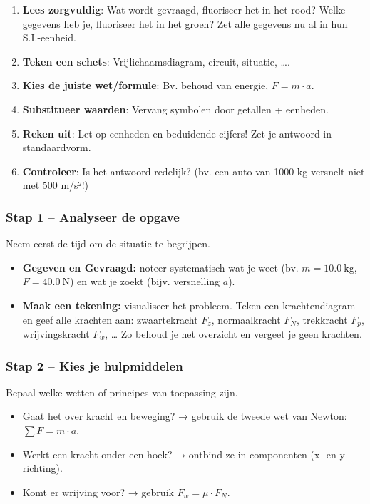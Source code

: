 {\begin{tcolorbox}[colback=cyan!5!white,colframe=cyan!75!black,title=Stappenplan voor fysica-problemen]
\begin{enumerate}
    \item \textbf{Lees zorgvuldig}: Wat wordt gevraagd, fluoriseer het in het rood? Welke gegevens heb je, fluoriseer het in het groen? Zet alle gegevens nu al in hun S.I.-eenheid.
    \item \textbf{Teken een schets}: Vrijlichaamsdiagram, circuit, situatie, \dots.
    \item \textbf{Kies de juiste wet/formule}: Bv. behoud van energie, \(F = m \cdot a\).
    \item \textbf{Substitueer waarden}: Vervang symbolen door getallen + eenheden.
    \item \textbf{Reken uit}: Let op eenheden en beduidende cijfers! Zet je antwoord in standaardvorm.
    \item \textbf{Controleer}: Is het antwoord redelijk? (bv. een auto van 1000 kg versnelt niet met 500 m/s²!)
\end{enumerate}
\end{tcolorbox}

\subsubsection*{Stap 1 – Analyseer de opgave}
Neem eerst de tijd om de situatie te begrijpen.
\begin{itemize}
  \item \textbf{Gegeven en Gevraagd:} noteer systematisch wat je weet (bv. $m=\qty{10,0}{\kilogram}$, $F=\qty{40,0}{\newton}$) en wat je zoekt (bijv. versnelling $a$).
  \item \textbf{Maak een tekening:} visualiseer het probleem.  
  Teken een krachtendiagram en geef alle krachten aan: zwaartekracht $F_z$, normaalkracht $F_N$, trekkracht $F_p$, wrijvingskracht $F_w$, …  
  Zo behoud je het overzicht en vergeet je geen krachten.
\end{itemize}

\subsubsection*{Stap 2 – Kies je hulpmiddelen}
Bepaal welke wetten of principes van toepassing zijn.
\begin{itemize}
  \item Gaat het over kracht en beweging? → gebruik de tweede wet van Newton: $\sum F = m \cdot a$.
  \item Werkt een kracht onder een hoek? → ontbind ze in componenten (x- en y-richting).
  \item Komt er wrijving voor? → gebruik $F_w = \mu \cdot F_N$.
\end{itemize}

}
